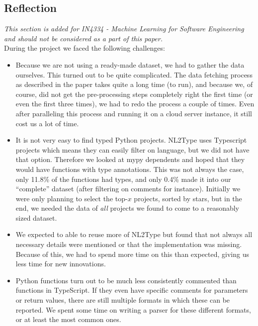 \begin{notsw}
\section{Reflection}
\textit{This section is added for IN4334 - Machine Learning for Software Engineering and should not be considered as a part of this paper.} \\

\noindent
During the project we faced the following challenges:

\begin{itemize}
    \item Because we are not using a ready-made dataset, we had to gather the data ourselves. This turned out to be quite complicated. The data fetching process as described in the paper takes quite a long time (to run), and because we, of course, did not get the pre-processing steps completely right the first time (or even the first three times), we had to redo the process a couple of times. Even after paralleling this process and running it on a cloud server instance, it still cost us a lot of time.
    
    \item It is not very easy to find typed Python projects. NL2Type uses Typescript projects which means they can easily filter on language, but we did not have that option. Therefore we looked at mypy dependents and hoped that they would have functions with type annotations. This was not always the case, only 11.8\% of the functions had types, and only 0.4\% made it into our ``complete'' dataset (after filtering on comments for instance). Initially we were only planning to select the top-$x$ projects, sorted by stars, but in the end, we needed the data of \textit{all} projects we found to come to a reasonably sized dataset.
    
    \item We expected to able to reuse more of NL2Type but found that not always all necessary details were mentioned or that the implementation was missing. Because of this, we had to spend more time on this than expected, giving us less time for new innovations.
    
    \item Python functions turn out to be much less consistently commented than functions in TypeScript. If they even have specific comments for parameters or return values, there are still multiple formats in which these can be reported. We spent some time on writing a parser for these different formats, or at least the most common ones.
    

\end{itemize}
\end{notsw}
